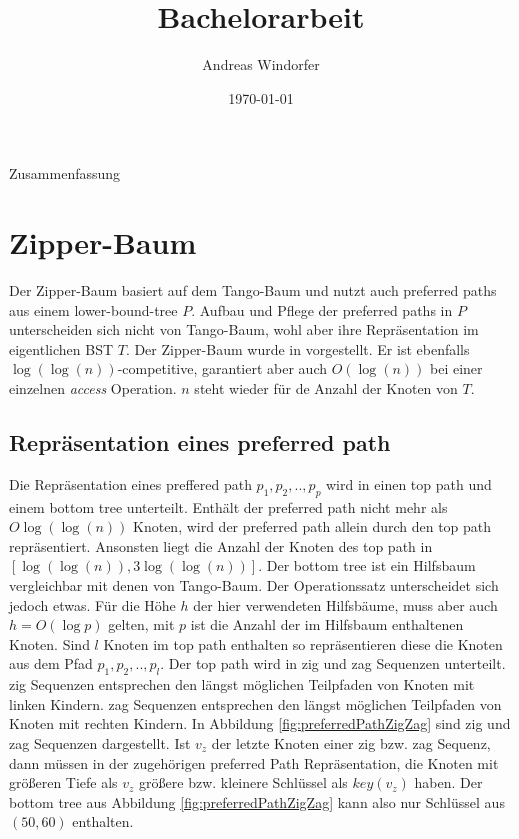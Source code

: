 \documentclass[a4paper,12pt]{article}
\title{Bachelorarbeit}
\author{

	Andreas Windorfer\\
}
\date{\today}
\begin{document}
\maketitle
\newpage
Zusammenfassung
\newpage
\tableofcontents


\newpage


\section {Zipper-Baum}
Der Zipper-Baum basiert auf dem Tango-Baum und nutzt auch preferred paths aus einem lower-bound-tree $P$. Aufbau und Pflege der preferred paths in $P$ unterscheiden sich nicht von Tango-Baum, wohl aber ihre Repräsentation im eigentlichen BST $T$. Der Zipper-Baum wurde in \cite{zipper} vorgestellt. Er ist ebenfalls $\log\left(\log\left(n\right)\right)$-competitive,  garantiert aber auch  $O\left(\log \left(n\right)\right)$ bei einer einzelnen \textit{access} Operation. $n$ steht wieder für de Anzahl der Knoten von $T$.

\subsection{Repräsentation eines preferred path}
Die Repräsentation eines preffered path $p_1,p_2,..,p_p$ wird in einen top path und einem bottom tree unterteilt. Enthält der preferred path nicht mehr als $O\log\left(\log\left(n\right)\right)$ Knoten, wird der preferred path allein durch den top path repräsentiert.  Ansonsten liegt die Anzahl der Knoten des top path in $\left[\log\left(\log\left(n\right)\right), 3 \log\left(\log\left(n\right)\right)  \right] $. Der bottom tree ist ein Hilfsbaum vergleichbar mit denen von Tango-Baum. Der Operationssatz unterscheidet sich jedoch etwas. Für die Höhe $h$ der hier verwendeten Hilfsbäume, muss aber auch $h = O\left(\log p\right)$ gelten, mit $p$ ist die Anzahl der im Hilfsbaum enthaltenen Knoten. Sind $l$ Knoten im top path enthalten so repräsentieren diese die Knoten aus dem Pfad $p_1, p_2,..,p_l$. Der top path wird in zig und zag Sequenzen unterteilt. zig Sequenzen entsprechen den längst möglichen Teilpfaden von Knoten mit linken Kindern. zag Sequenzen entsprechen den längst möglichen Teilpfaden von Knoten mit rechten Kindern. In Abbildung  \ref{fig:preferredPathZigZag} sind zig und zag Sequenzen dargestellt. Ist $v_z$ der letzte Knoten einer zig bzw. zag Sequenz, dann müssen in der zugehörigen preferred Path Repräsentation, die Knoten mit größeren Tiefe als $v_z$ größere bzw. kleinere Schlüssel als $\mathit{key}\left(v_z\right)$ haben. Der bottom tree aus Abbildung \ref{fig:preferredPathZigZag} kann also nur Schlüssel aus $\left(50,60\right)$ enthalten. 
\end{document}
